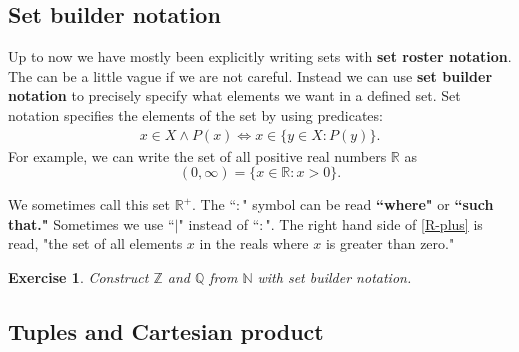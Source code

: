 \documentclass{article}[12pt]
\newtheorem{exercise}{Exercise}
\newcommand{\N}{\mathbb{N}}
\newcommand{\Z}{\mathbb{Z}}
\newcommand{\Q}{\mathbb{Q}}
\newcommand{\R}{\mathbb{R}}
\begin{document}
    \subsection{Set builder notation}
        
        Up to now we have mostly been explicitly writing sets with \textbf{set roster notation}. The can be a little vague if we are not careful. Instead we can use \textbf{set builder notation} to precisely specify what elements we want in a defined set. Set notation specifies the elements of the set by using predicates:
        \begin{align}
            x \in X \land P(x) \iff x \in \{y \in X : P(y)\}.
        \end{align}
        For example, we can write the set of all positive real numbers $\R$ as
        \begin{equation}
            (0, \infty) = \{x \in \R : x > 0\}. \label{R-plus}
        \end{equation}
        
        We sometimes call this set $\R^+$. The ``$:$" symbol can be read \textbf{``where"} or \textbf{``such that."} Sometimes we use ``$|$" instead of ``$:$". The right hand side of \eqref{R-plus} is read, "the set of all elements $x$ in the reals where $x$ is greater than zero."
        
        \begin{exercise}
            Construct $\Z$ and $\Q$ from $\N$ with set builder notation.
        \end{exercise}
        
    \subsection{Tuples and Cartesian product}
        
\end{document}

